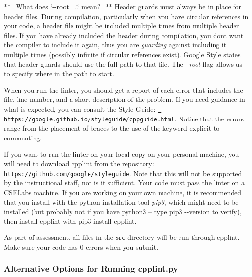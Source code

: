 \begin{DoxyCode}{0}
\end{DoxyCode}


$\ast$$\ast$\+\_\+\+What does \char`\"{}-\/-\/root=..\char`\"{} mean?\+\_\+$\ast$$\ast$ Header guards must always be in place for header files. During compilation, particularly when you have circular references in your code, a header file might be included multiple times from multiple header files. If you have already included the header during compilation, you don\textquotesingle{}t want the compiler to include it again, thus you are {\itshape guarding} against including it multiple times (possibly infinite if circular references exist). Google Style states that header guards should use the full path to that file. The {\itshape --root} flag allows us to specify where in the path to start.

When you run the linter, you should get a report of each error that includes the file, line number, and a short description of the problem. If you need guidance in what is expected, you can consult the Style Guide\+: \href{https://google.github.io/styleguide/cppguide.html}{\texttt{ https\+://google.\+github.\+io/styleguide/cppguide.\+html}}. Notice that the errors range from the placement of braces to the use of the keyword {\ttfamily explicit} to commenting.

If you want to run the linter on your local copy on your personal machine, you will need to download cpplint from the repository\+: \href{https://github.com/google/styleguide}{\texttt{ https\+://github.\+com/google/styleguide}}. Note that this will not be supported by the instructional staff, nor is it sufficient. Your code must pass the linter on a C\+S\+E\+Labs machine. If you are working on your own machine, it is recommended that you install with the python installation tool {\itshape pip3}, which might need to be installed (but probably not if you have python3 -- type {\ttfamily pip3 -\/-\/version} to verify), then install cpplint with {\ttfamily pip3 install cpplint}.

As part of assessment, all files in the {\bfseries{src}} directory will be run through cpplint. Make sure your code has 0 errors when you submit.

\subsubsection*{Alternative Options for Running cpplint.\+py}

